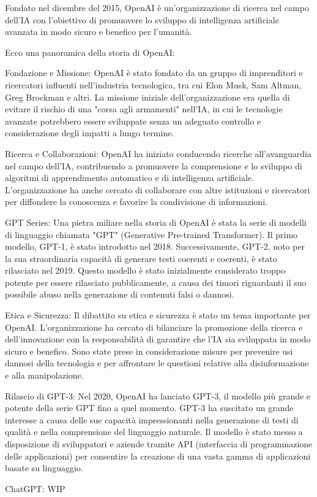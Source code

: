 Fondato nel dicembre del 2015, OpenAI è un'organizzazione di ricerca nel campo dell'IA con l'obiettivo di promuovere lo sviluppo di intelligenza artificiale avanzata in modo sicuro e benefico per l'umanità.

Ecco una panoramica della storia di OpenAI:

Fondazione e Missione: OpenAI è stato fondato da un gruppo di imprenditori e ricercatori influenti nell'industria tecnologica, tra cui Elon Musk, Sam Altman, Greg Brockman e altri. La missione iniziale dell'organizzazione era quella di evitare il rischio di una "corsa agli armamenti" nell'IA, in cui le tecnologie avanzate potrebbero essere sviluppate senza un adeguato controllo e considerazione degli impatti a lungo termine.

Ricerca e Collaborazioni: OpenAI ha iniziato conducendo ricerche all'avanguardia nel campo dell'IA, contribuendo a promuovere la comprensione e lo sviluppo di algoritmi di apprendimento automatico e di intelligenza artificiale. L'organizzazione ha anche cercato di collaborare con altre istituzioni e ricercatori per diffondere la conoscenza e favorire la condivisione di informazioni.

GPT Series: Una pietra miliare nella storia di OpenAI è stata la serie di modelli di linguaggio chiamata "GPT" (Generative Pre-trained Transformer). Il primo modello, GPT-1, è stato introdotto nel 2018. Successivamente, GPT-2, noto per la sua straordinaria capacità di generare testi coerenti e coerenti, è stato rilasciato nel 2019. Questo modello è stato inizialmente considerato troppo potente per essere rilasciato pubblicamente, a causa dei timori riguardanti il suo possibile abuso nella generazione di contenuti falsi o dannosi.

Etica e Sicurezza: Il dibattito su etica e sicurezza è stato un tema importante per OpenAI. L'organizzazione ha cercato di bilanciare la promozione della ricerca e dell'innovazione con la responsabilità di garantire che l'IA sia sviluppata in modo sicuro e benefico. Sono state prese in considerazione misure per prevenire usi dannosi della tecnologia e per affrontare le questioni relative alla disinformazione e alla manipolazione.

Rilascio di GPT-3: Nel 2020, OpenAI ha lanciato GPT-3, il modello più grande e potente della serie GPT fino a quel momento. GPT-3 ha suscitato un grande interesse a causa delle sue capacità impressionanti nella generazione di testi di qualità e nella comprensione del linguaggio naturale. Il modello è stato messo a disposizione di sviluppatori e aziende tramite API (interfaccia di programmazione delle applicazioni) per consentire la creazione di una vasta gamma di applicazioni basate su linguaggio.

ChatGPT: WIP